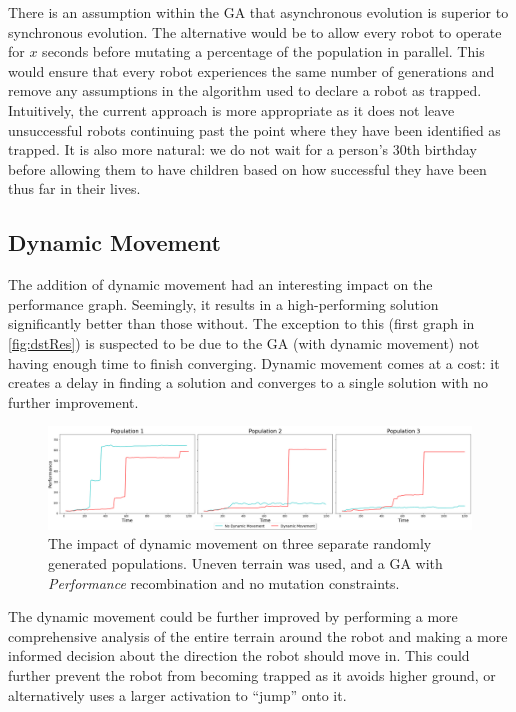 \documentclass{article}
\begin{document}
There is an assumption within the GA that asynchronous evolution is superior to synchronous evolution. The alternative would be to allow every robot to operate for $x$ seconds before mutating a percentage of the population in parallel. This would ensure that every robot experiences the same number of generations and remove any assumptions in the algorithm used to declare a robot as trapped. \\
Intuitively, the current approach is more appropriate as it does not leave unsuccessful robots continuing past the point where they have been identified as trapped. It is also more natural: we do not wait for a person’s 30th birthday before allowing them to have children based on how successful they have been thus far in their lives. \\

\newpage
\subsection{Dynamic Movement}
\label{sec:DST Res}
The addition of dynamic movement had an interesting impact on the performance graph. Seemingly, it results in a high-performing solution significantly better than those without. The exception to this (first graph in \autoref{fig:dstRes}) is suspected to be due to the GA (with dynamic movement) not having enough time to finish converging. Dynamic movement comes at a cost: it creates a delay in finding a solution and converges to a single solution with no further improvement.
\begin{figure}[H]
\centering
\centerline{\includegraphics[scale=0.55]{dstResults} }
\caption{The impact of dynamic movement on three separate randomly generated populations. Uneven terrain was used, and a GA with \textit{Performance} recombination and no mutation constraints.}
\label{fig:dstRes}
\end{figure}
The dynamic movement could be further improved by performing a more comprehensive analysis of the entire terrain around the robot and making a more informed decision about the direction the robot should move in. This could further prevent the robot from becoming trapped as it avoids higher ground, or alternatively uses a larger activation to “jump” onto it.\\
\end{document}
